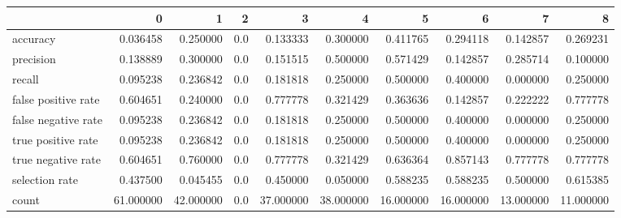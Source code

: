 \begin{tabular}{lrrrrrrrrr}
\toprule
{} &          0 &          1 &    2 &          3 &          4 &          5 &          6 &          7 &          8 \\
\midrule
accuracy            &   0.036458 &   0.250000 &  0.0 &   0.133333 &   0.300000 &   0.411765 &   0.294118 &   0.142857 &   0.269231 \\
precision           &   0.138889 &   0.300000 &  0.0 &   0.151515 &   0.500000 &   0.571429 &   0.142857 &   0.285714 &   0.100000 \\
recall              &   0.095238 &   0.236842 &  0.0 &   0.181818 &   0.250000 &   0.500000 &   0.400000 &   0.000000 &   0.250000 \\
false positive rate &   0.604651 &   0.240000 &  0.0 &   0.777778 &   0.321429 &   0.363636 &   0.142857 &   0.222222 &   0.777778 \\
false negative rate &   0.095238 &   0.236842 &  0.0 &   0.181818 &   0.250000 &   0.500000 &   0.400000 &   0.000000 &   0.250000 \\
true positive rate  &   0.095238 &   0.236842 &  0.0 &   0.181818 &   0.250000 &   0.500000 &   0.400000 &   0.000000 &   0.250000 \\
true negative rate  &   0.604651 &   0.760000 &  0.0 &   0.777778 &   0.321429 &   0.636364 &   0.857143 &   0.777778 &   0.777778 \\
selection rate      &   0.437500 &   0.045455 &  0.0 &   0.450000 &   0.050000 &   0.588235 &   0.588235 &   0.500000 &   0.615385 \\
count               &  61.000000 &  42.000000 &  0.0 &  37.000000 &  38.000000 &  16.000000 &  16.000000 &  13.000000 &  11.000000 \\
\bottomrule
\end{tabular}
